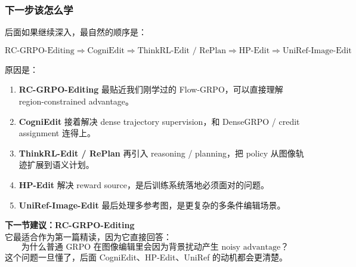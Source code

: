 \subsubsection{下一步该怎么学}

后面如果继续深入，最自然的顺序是：

\[
\text{RC-GRPO-Editing}
\Rightarrow
\text{CogniEdit}
\Rightarrow
\text{ThinkRL-Edit / RePlan}
\Rightarrow
\text{HP-Edit}
\Rightarrow
\text{UniRef-Image-Edit}
\]

原因是：

\begin{enumerate}[leftmargin=1.5em]
  \item \textbf{RC-GRPO-Editing} 最贴近我们刚学过的 Flow-GRPO，可以直接理解 region-constrained advantage。
  \item \textbf{CogniEdit} 接着解决 dense trajectory supervision，和 DenseGRPO / credit assignment 连得上。
  \item \textbf{ThinkRL-Edit / RePlan} 再引入 reasoning / planning，把 policy 从图像轨迹扩展到语义计划。
  \item \textbf{HP-Edit} 解决 reward source，是后训练系统落地必须面对的问题。
  \item \textbf{UniRef-Image-Edit} 最后处理多参考图，是更复杂的多条件编辑场景。
\end{enumerate}

\begin{conceptbox}
\textbf{下一节建议：RC-GRPO-Editing}\\
它最适合作为第一篇精读，因为它直接回答：
\[
\text{为什么普通 GRPO 在图像编辑里会因为背景扰动产生 noisy advantage？}
\]
这个问题一旦懂了，后面 CogniEdit、HP-Edit、UniRef 的动机都会更清楚。
\end{conceptbox}
